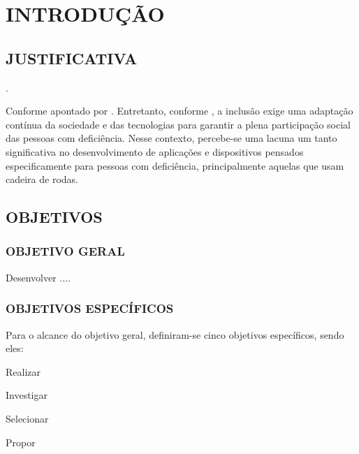 \chapter{INTRODUÇÃO}
\label{cap:introducao}
\glsresetall 

\lipsum[3]

\section{JUSTIFICATIVA}
\label{sec:justificativa}

\lipsum[2]\cite{AutorAno}.

Conforme apontado por . Entretanto, conforme , a inclusão exige uma adaptação contínua da sociedade e das tecnologias para garantir a plena participação social das pessoas com deficiência. Nesse contexto, percebe-se uma lacuna um tanto significativa no desenvolvimento de aplicações e dispositivos pensados especificamente para pessoas com deficiência, principalmente aquelas que usam cadeira de rodas.

\lipsum[2]

\section{OBJETIVOS}\label{sec:objetivos}

\subsection{OBJETIVO GERAL}
\label{sec:objetivo-geral}

Desenvolver ....

\subsection{OBJETIVOS ESPECÍFICOS}
\label{sec:objetivos-especificos}

Para o alcance do objetivo geral, definiram-se cinco objetivos específicos, sendo eles: 

\begin{alineas} 
    \item Realizar 
    \item Investigar  
    \item Selecionar  
    \item Propor 
\end{alineas}
